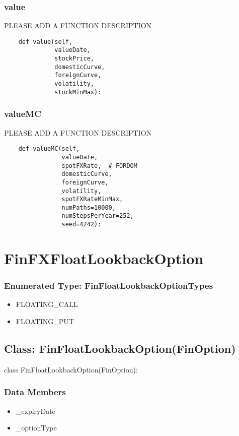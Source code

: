 \documentclass[twoside,11pt]{book}
\begin{document}
\subsubsection*{{\bf value}}
PLEASE ADD A FUNCTION DESCRIPTION

\begin{lstlisting}
    def value(self,
              valueDate,
              stockPrice,
              domesticCurve,
              foreignCurve,
              volatility,
              stockMinMax):
\end{lstlisting}

\subsubsection*{{\bf valueMC}}
PLEASE ADD A FUNCTION DESCRIPTION

\begin{lstlisting}
    def valueMC(self,
                valueDate,
                spotFXRate,  # FORDOM
                domesticCurve,
                foreignCurve,
                volatility,
                spotFXRateMinMax,
                numPaths=10000,
                numStepsPerYear=252,
                seed=4242):
\end{lstlisting}

\newpage
\section{FinFXFloatLookbackOption}

\subsubsection{Enumerated Type: FinFloatLookbackOptionTypes}
\begin{itemize}
\item{FLOATING\_CALL}
\item{FLOATING\_PUT}
\end{itemize}

\subsection*{Class: FinFloatLookbackOption(FinOption)}
class FinFloatLookbackOption(FinOption): 

\subsubsection*{Data Members}
\begin{itemize}
\item{\_expiryDate}
\item{\_optionType}
\end{itemize}
\end{document}
